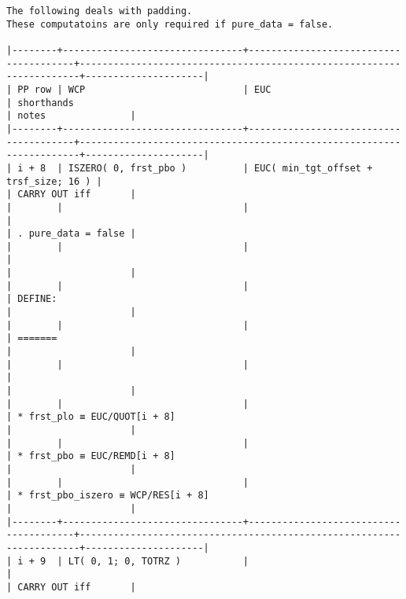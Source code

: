 \documentclass[varwidth=\maxdimen,margin=0.5cm,multi={verbatim}]{standalone}
\begin{document}
\begin{verbatim}
The following deals with padding.
These computatoins are only required if pure_data = false.

|--------+--------------------------------+---------------------------------------+----------------------------------------------------------------------+---------------------|
| PP row | WCP                            | EUC                                   | shorthands                                                           | notes               |
|--------+--------------------------------+---------------------------------------+----------------------------------------------------------------------+---------------------|
| i + 8  | ISZERO( 0, frst_pbo )          | EUC( min_tgt_offset + trsf_size; 16 ) |                                                                      | CARRY OUT iff       |
|        |                                |                                       |                                                                      | . pure_data = false |
|        |                                |                                       |                                                                      |                     |
|        |                                |                                       | DEFINE:                                                              |                     |
|        |                                |                                       | =======                                                              |                     |
|        |                                |                                       |                                                                      |                     |
|        |                                |                                       | * frst_plo ≡ EUC/QUOT[i + 8]                                         |                     |
|        |                                |                                       | * frst_pbo ≡ EUC/REMD[i + 8]                                         |                     |
|        |                                |                                       | * frst_pbo_iszero ≡ WCP/RES[i + 8]                                   |                     |
|--------+--------------------------------+---------------------------------------+----------------------------------------------------------------------+---------------------|
| i + 9  | LT( 0, 1; 0, TOTRZ )           |                                       |                                                                      | CARRY OUT iff       |

\end{verbatim}
\end{document}
